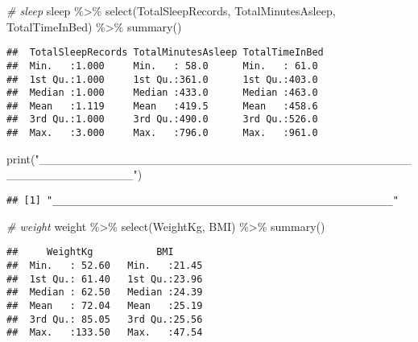 \documentclass[
]{article}
\newenvironment{Shaded}{\begin{snugshade}}{\end{snugshade}}
\newcommand{\CommentTok}[1]{\textcolor[rgb]{0.56,0.35,0.01}{\textit{#1}}}
\newcommand{\FunctionTok}[1]{\textcolor[rgb]{0.00,0.00,0.00}{#1}}
\newcommand{\NormalTok}[1]{#1}
\newcommand{\SpecialCharTok}[1]{\textcolor[rgb]{0.00,0.00,0.00}{#1}}
\newcommand{\StringTok}[1]{\textcolor[rgb]{0.31,0.60,0.02}{#1}}
\begin{document}
\begin{Shaded}
\begin{Highlighting}[]
\CommentTok{\# sleep}
\NormalTok{sleep }\SpecialCharTok{\%\textgreater{}\%}
  \FunctionTok{select}\NormalTok{(TotalSleepRecords, TotalMinutesAsleep, TotalTimeInBed) }\SpecialCharTok{\%\textgreater{}\%}
  \FunctionTok{summary}\NormalTok{()}
\end{Highlighting}
\end{Shaded}

\begin{verbatim}
##  TotalSleepRecords TotalMinutesAsleep TotalTimeInBed 
##  Min.   :1.000     Min.   : 58.0      Min.   : 61.0  
##  1st Qu.:1.000     1st Qu.:361.0      1st Qu.:403.0  
##  Median :1.000     Median :433.0      Median :463.0  
##  Mean   :1.119     Mean   :419.5      Mean   :458.6  
##  3rd Qu.:1.000     3rd Qu.:490.0      3rd Qu.:526.0  
##  Max.   :3.000     Max.   :796.0      Max.   :961.0
\end{verbatim}

\begin{Shaded}
\begin{Highlighting}[]
\FunctionTok{print}\NormalTok{(}\StringTok{"\_\_\_\_\_\_\_\_\_\_\_\_\_\_\_\_\_\_\_\_\_\_\_\_\_\_\_\_\_\_\_\_\_\_\_\_\_\_\_\_\_\_\_\_\_\_\_\_\_\_\_\_\_\_\_\_\_\_\_"}\NormalTok{)}
\end{Highlighting}
\end{Shaded}

\begin{verbatim}
## [1] "___________________________________________________________"
\end{verbatim}

\begin{Shaded}
\begin{Highlighting}[]
\CommentTok{\# weight}
\NormalTok{weight }\SpecialCharTok{\%\textgreater{}\%}
  \FunctionTok{select}\NormalTok{(WeightKg, BMI) }\SpecialCharTok{\%\textgreater{}\%}
  \FunctionTok{summary}\NormalTok{()}
\end{Highlighting}
\end{Shaded}

\begin{verbatim}
##     WeightKg           BMI       
##  Min.   : 52.60   Min.   :21.45  
##  1st Qu.: 61.40   1st Qu.:23.96  
##  Median : 62.50   Median :24.39  
##  Mean   : 72.04   Mean   :25.19  
##  3rd Qu.: 85.05   3rd Qu.:25.56  
##  Max.   :133.50   Max.   :47.54
\end{verbatim}
\end{document}
